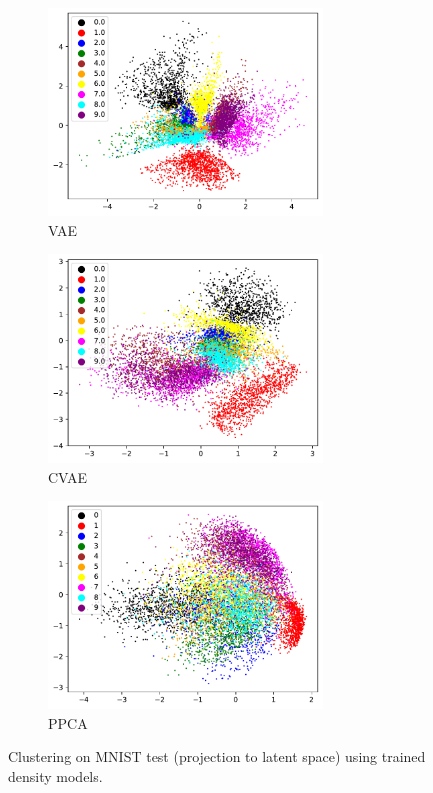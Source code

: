 \begin{figure}[H]
	\begin{subfigure}[t]{0.49\textwidth}
		\centering
		\includegraphics[width = 0.8\textwidth]{figures/VAE/clustering}
		\caption{VAE}
		\label{fig:vae:clustering}
	\end{subfigure}
	\begin{subfigure}[t]{0.49\textwidth}
		\centering
		\includegraphics[width = 0.8\textwidth]{figures/CVAE/clustering}
		\caption{CVAE}
		\label{fig:cvae:clustering}
	\end{subfigure}
	\begin{subfigure}[t]{0.49\textwidth}
		\centering
		\includegraphics[width = 0.8\textwidth]{figures/ppca/clustering}
		\caption{PPCA}
		\label{fig:ppca:clustering}
	\end{subfigure}
	\caption{Clustering on MNIST test (projection to latent space) using trained density models.}	
\end{figure}


\citep{bishop2006pattern}



